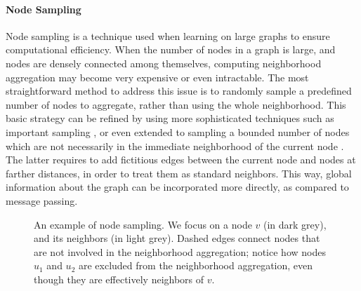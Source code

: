 \paragraph{Node Sampling}
Node sampling is a technique used when learning on large graphs to ensure computational efficiency. When the number of nodes in a graph is large, and nodes are densely connected among themselves, computing neighborhood aggregation may become very expensive or even intractable. The most straightforward method to address this issue is to randomly sample a predefined number of nodes to aggregate, rather than using the whole neighborhood. This basic strategy can be refined by using more sophisticated techniques such as important sampling \cite{?}, or even extended to sampling a bounded number of nodes which are not necessarily in the immediate neighborhood of the current node \cite{?}. The latter requires to add fictitious edges between the current node and nodes at farther distances, in order to treat them as standard neighbors. This way, global information about the graph can be incorporated more directly, as compared to message passing.

\begin{figure}[h!]
    \centering
    \resizebox{.35\textwidth}{!}{}
    \caption{An example of node sampling. We focus on a node $v$ (in dark grey), and its neighbors (in light grey). Dashed edges connect nodes that are not involved in the neighborhood aggregation; notice how nodes $u_1$ and $u_2$ are excluded from the neighborhood aggregation, even though they are effectively neighbors of $v$.}
    \label{fig:sampling}
\end{figure}

